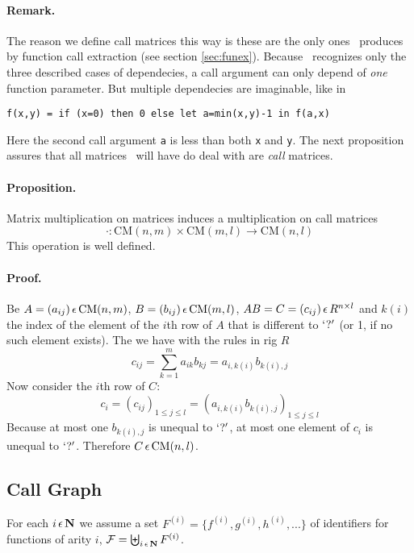 \paragraph*{Remark.} The reason we define call matrices this way is
these are the only ones \foetus\ produces by function call extraction
(see section \ref{sec:funex}). Because \foetus\ recognizes only the
three described cases of dependecies, a call argument can only depend
of {\em one} function parameter. But multiple dependecies are
imaginable, like in
\begin{verbatim}
f(x,y) = if (x=0) then 0 else let a=min(x,y)-1 in f(a,x)
\end{verbatim}
Here the second call argument {\tt a} is less than both {\tt x} and
{\tt y}. The next proposition assures that all matrices \foetus\ will
have do deal with are {\em call} matrices.
\paragraph*{Proposition.}
Matrix multiplication on matrices induces a multiplication on call matrices
$$
    \cdot : \mathrm{CM}(n,m) \times \mathrm{CM}(m,l) \rightarrow
    \mathrm{CM}(n,l)
$$
This operation is well defined.
\paragraph*{Proof.}
Be $A = (a_{ij}) \,\epsilon\, \mathrm{CM}(n,m)$, $B = (b_{ij}) \,\epsilon\,
\mathrm{CM}(m,l)$, $AB = C = (c_{ij}) \,\epsilon\, R^{n \times l}$ and $k(i)$ the
index of the element of the $i$th row of $A$ that is different to
$`?'$ (or 1, if no such element exists). The we have with the
rules in rig $R$
$$
    c_{ij} = \sum_{k=1}^m a_{ik} b_{kj} = a_{i,k(i)} b_{k(i),j}
$$
Now consider the $i$th row of $C$:
$$
    c_i = (c_{ij})_{1 \leq j \leq l} = (a_{i,k(i)} b_{k(i),j})_{1 \leq
      j \leq l}
$$
Because at most one $b_{k(i),j}$ is unequal to $`?'$, at most one
element of $c_i$ is unequal to $`?'$. Therefore $C \,\epsilon\,
\mathrm{CM}(n,l)$.

\subsection{Call Graph}
For each $i \,\epsilon\, \mathbf{N}$ we assume a set $F^{(i)} = \{f^{(i)}, g^{(i)},
h^{(i)}, ...\}$ of identifiers for functions of arity $i$,
$\mathcal{F} = \biguplus_{i \,\epsilon\, \mathbf{N}} F^{(i)}$.
